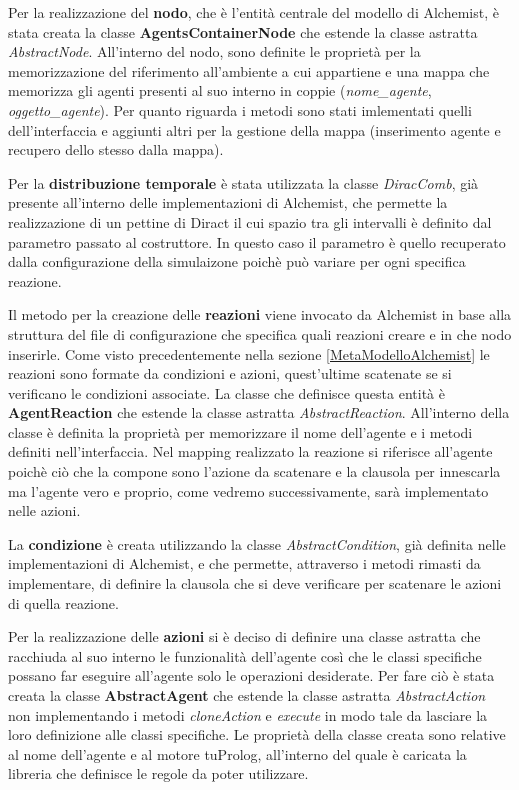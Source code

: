 \documentclass[12pt,a4paper,openright,twoside]{report}
\begin{document}
Per la realizzazione del \textbf{nodo}, che \`e l'entit\`a centrale del modello di Alchemist, \`e stata creata la classe \textbf{AgentsContainerNode} che estende la classe astratta \textit{AbstractNode}. All'interno del nodo, sono definite le propriet\`a per la memorizzazione del riferimento all'ambiente a cui appartiene e una mappa che memorizza gli agenti presenti al suo interno in coppie (\textit{nome\_agente}, \textit{oggetto\_agente}). Per quanto riguarda i metodi sono stati imlementati quelli dell'interfaccia e aggiunti altri per la gestione della mappa (inserimento agente e recupero dello stesso dalla mappa).

Per la \textbf{distribuzione temporale} \`e stata utilizzata la classe \textit{DiracComb}, gi\`a presente all'interno delle implementazioni di Alchemist, che permette la realizzazione di un pettine di Diract il cui spazio tra gli intervalli \`e definito dal parametro passato al costruttore. In questo caso il parametro \`e quello recuperato dalla configurazione della simulaizone poich\`e pu\`o variare per ogni specifica reazione.

Il metodo per la creazione delle \textbf{reazioni} viene invocato da Alchemist in base alla struttura del file di configurazione che specifica quali reazioni creare e in che nodo inserirle. Come visto precedentemente nella sezione \ref{MetaModelloAlchemist} le reazioni sono formate da condizioni e azioni, quest'ultime scatenate se si verificano le condizioni associate. La classe che definisce questa entit\`a \`e \textbf{AgentReaction} che estende la classe astratta \textit{AbstractReaction}. All'interno della classe \`e definita la propriet\`a per memorizzare il nome dell'agente e i metodi definiti nell'interfaccia.
Nel mapping realizzato la reazione si riferisce all'agente poich\`e ci\`o che la compone sono l'azione da scatenare e la clausola per innescarla ma l'agente vero e proprio, come vedremo successivamente, sar\`a implementato nelle azioni.

La \textbf{condizione} \`e creata utilizzando la classe \textit{AbstractCondition}, gi\`a definita nelle implementazioni di Alchemist, e che permette, attraverso i metodi rimasti da implementare, di definire la clausola che si deve verificare per scatenare le azioni di quella reazione.

Per la realizzazione delle \textbf{azioni} si \`e deciso di definire una classe astratta che racchiuda al suo interno le funzionalit\`a dell'agente cos\`i che le classi specifiche possano far eseguire all'agente solo le operazioni desiderate. Per fare ci\`o \`e stata creata la classe \textbf{AbstractAgent} che estende la classe astratta \textit{AbstractAction} non implementando i metodi \textit{cloneAction} e \textit{execute} in modo tale da lasciare la loro definizione alle classi specifiche. Le propriet\`a della classe creata sono relative al nome dell'agente e al motore tuProlog, all'interno del quale \`e caricata la libreria che definisce le regole da poter utilizzare.
\end{document}
